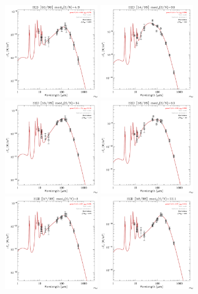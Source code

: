 \documentclass[preprint2,longabstract]{aastex}
\begin{document}
\begin{figure}
    \includegraphics[trim=0 2mm 0 0, clip, width=40mm]{SEDs/sed_53.pdf}
	\includegraphics[trim=0 2mm 0 0, clip, width=40mm]{SEDs/sed_54.pdf}
	\includegraphics[trim=0 2mm 0 0, clip, width=40mm]{SEDs/sed_55.pdf}
	\includegraphics[trim=0 2mm 0 0, clip, width=40mm]{SEDs/sed_56.pdf}
	\includegraphics[trim=0 2mm 0 0, clip, width=40mm]{SEDs/sed_57.pdf}
	\includegraphics[trim=0 2mm 0 0, clip, width=40mm]{SEDs/sed_58.pdf}

\end{figure}
\end{document}

